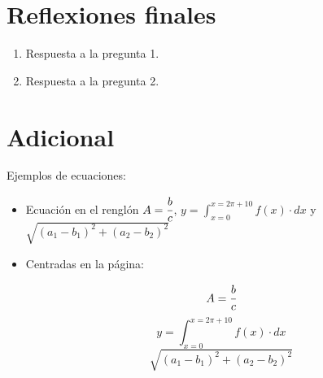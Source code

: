 \documentclass[letter]{article}
\begin{document}
\section{Reflexiones finales}

\begin{enumerate}

    \item Respuesta a la pregunta 1.
    
    \item Respuesta a la pregunta 2.

\end{enumerate}

\section{Adicional}

Ejemplos de ecuaciones:
\begin{itemize}

    \item Ecuación en el renglón $A=\cfrac{b}{c}$, $y = \int_{x=0}^{x=2 \pi + 10} f(x) \cdot dx$ y $ \sqrt{(a_1-b_1)^2 + (a_2-b_2)^2} $
    
    \item Centradas en la página:
    
    $$A=\cfrac{b}{c}$$
    $$y = \int_{x=0}^{x=2 \pi + 10} f(x) \cdot dx$$
    $$ \sqrt{(a_1-b_1)^2 + (a_2-b_2)^2} $$

\end{itemize}

\end{document}
